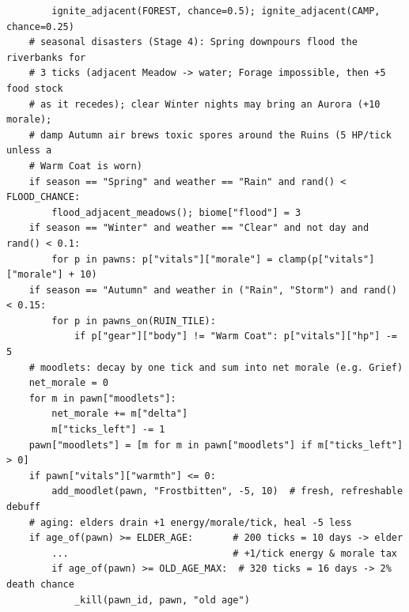 \documentclass[10pt,a4paper]{article}
\begin{document}
\begin{lstlisting}
        ignite_adjacent(FOREST, chance=0.5); ignite_adjacent(CAMP, chance=0.25)
    # seasonal disasters (Stage 4): Spring downpours flood the riverbanks for
    # 3 ticks (adjacent Meadow -> water; Forage impossible, then +5 food stock
    # as it recedes); clear Winter nights may bring an Aurora (+10 morale);
    # damp Autumn air brews toxic spores around the Ruins (5 HP/tick unless a
    # Warm Coat is worn)
    if season == "Spring" and weather == "Rain" and rand() < FLOOD_CHANCE:
        flood_adjacent_meadows(); biome["flood"] = 3
    if season == "Winter" and weather == "Clear" and not day and rand() < 0.1:
        for p in pawns: p["vitals"]["morale"] = clamp(p["vitals"]["morale"] + 10)
    if season == "Autumn" and weather in ("Rain", "Storm") and rand() < 0.15:
        for p in pawns_on(RUIN_TILE):
            if p["gear"]["body"] != "Warm Coat": p["vitals"]["hp"] -= 5
    # moodlets: decay by one tick and sum into net morale (e.g. Grief)
    net_morale = 0
    for m in pawn["moodlets"]:
        net_morale += m["delta"]
        m["ticks_left"] -= 1
    pawn["moodlets"] = [m for m in pawn["moodlets"] if m["ticks_left"] > 0]
    if pawn["vitals"]["warmth"] <= 0:
        add_moodlet(pawn, "Frostbitten", -5, 10)  # fresh, refreshable debuff
    # aging: elders drain +1 energy/morale/tick, heal -5 less
    if age_of(pawn) >= ELDER_AGE:       # 200 ticks = 10 days -> elder
        ...                             # +1/tick energy & morale tax
        if age_of(pawn) >= OLD_AGE_MAX:  # 320 ticks = 16 days -> 2% death chance
            _kill(pawn_id, pawn, "old age")
\end{lstlisting}
\end{document}
